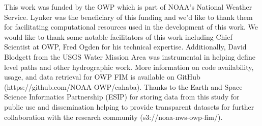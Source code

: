 \documentclass[draft]{dependencies/agujournal2019}
\begin{document}
\acknowledgments
This work was funded by the OWP which is part of NOAA's National Weather Service.
Lynker was the beneficiary of this funding and we'd like to thank them for facilitating computational resources used in the development of this work.
We would like to thank some notable facilitators of this work including Chief Scientist at OWP, Fred Ogden for his technical expertise.
Additionally, David Blodgett from the USGS Water Mission Area was instrumental in helping define level paths and other hydrographic work.
More information on code availability, usage, and data retrieval for OWP FIM is available on GitHub (https://github.com/NOAA-OWP/cahaba).
Thanks to the Earth and Space Science Informatics Partnership (ESIP) for storing data from this study for public use and dissemination helping to provide transparent datasets for further collaboration with the research community (s3://noaa-nws-owp-fim/).



%
%
%
\clearpage %

%
%
%
%
%
%
\end{document}
